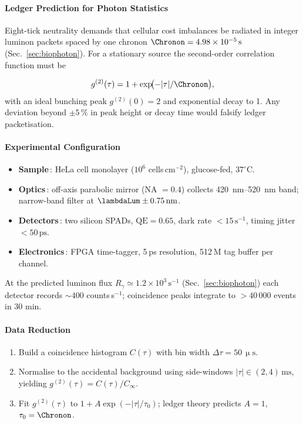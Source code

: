 \documentclass[11pt,oneside]{book}
\begin{document}
{\paragraph{Ledger Prediction for Photon Statistics}

Eight-tick neutrality demands that cellular cost imbalances be
radiated in integer luminon packets spaced by one chronon
\(\Chronon=4.98\times10^{-5}\,\text{s}\)
(Sec.~\ref{sec:biophoton}).
For a stationary source the second-order correlation function must be

\[
   g^{(2)}(\tau)
   =
   1+\exp\!\bigl(-|\tau|/\Chronon\bigr),
   \label{eq:g2-ledger}
\]
with an ideal bunching peak
\(g^{(2)}(0)=2\)
and exponential decay to 1.
Any deviation beyond \(\pm5\,\%\) in peak height or decay time
would falsify ledger packetisation.

\paragraph{Experimental Configuration}

\begin{itemize}
\item \textbf{Sample}\,: HeLa cell monolayer
      (\(10^{6}\) cells\,cm\(^{-2}\)), glucose-fed, \(37^{\circ}\text{C}\).
\item \textbf{Optics}\,: off-axis parabolic mirror
      (NA \(=0.4\)) collects \SI{420}{\nano\metre}–\SI{520}{\nano\metre}
      band; narrow-band filter at \(\lambdaLum\pm0.75\,\text{nm}\).
\item \textbf{Detectors}\,: two silicon SPADs,
      \(\mathrm{QE}=0.65\), dark rate \(<15\,\text{s}^{-1}\),
      timing jitter \(<50\,\text{ps}\).
\item \textbf{Electronics}\,: FPGA time-tagger, 5 ps resolution,
      512 M tag buffer per channel.
\end{itemize}

At the predicted luminon flux
\(R_{\gamma}\simeq1.2\times10^{3}\,\text{s}^{-1}\)
(Sec.~\ref{sec:biophoton})
each detector records \(\sim400\) counts s\(^{-1}\);
coincidence peaks integrate to \(>40\,000\) events in 30 min.

\paragraph{Data Reduction}

\begin{enumerate}[leftmargin=*,itemsep=3pt]
\item Build a coincidence histogram \(C(\tau)\) with bin width
      \(\Delta\tau=50\,\upmu\text{s}\).
\item Normalise to the accidental background using
      side-windows
      \(|\tau|\!\in\!(2,4)\,\text{ms}\),
      yielding
      \(g^{(2)}(\tau)=C(\tau)/C_{\infty}\).
\item Fit \(g^{(2)}(\tau)\) to
      \(1+A\exp(-|\tau|/\tau_{0})\);
      ledger theory predicts \(A=1\), \(\tau_{0}=\Chronon\).
\end{enumerate}

}
\end{document}
